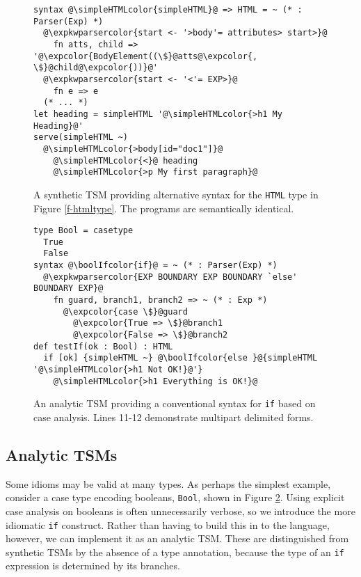 \documentclass{sig-alternate}
\newcommand{\expkwparsercolor}[1]{\textcolor[HTML]{336699}{#1}}
\newcommand{\expcolor}[1]{\textcolor[HTML]{FF0033}{#1}}
\newcommand{\simpleHTMLcolor}[1]{\textcolor[HTML]{7D5100}{#1}}
\newcommand{\boolIfcolor}[1]{\textcolor[HTML]{5E0C0C}{#1}}
\newcommand{\mycaption}[1]{\vspace{-4px}\caption{#1}\vspace{-2px}}
\begin{document}



\begin{figure}[t]
\begin{lstlisting}[style=wyvern]
syntax @\simpleHTMLcolor{simpleHTML}@ => HTML = ~ (* : Parser(Exp) *)
  @\expkwparsercolor{start <- '>body'= attributes> start>}@
    fn atts, child => '@\expcolor{BodyElement((\$}@atts@\expcolor{, \$}@child@\expcolor{))}@'
  @\expkwparsercolor{start <- '<'= EXP>}@
    fn e => e
  (* ... *)
let heading = simpleHTML '@\simpleHTMLcolor{>h1 My Heading}@'
serve(simpleHTML ~)
  @\simpleHTMLcolor{>body[id="doc1"]}@
    @\simpleHTMLcolor{<}@ heading
    @\simpleHTMLcolor{>p My first paragraph}@
\end{lstlisting}
\mycaption{A synthetic TSM providing alternative syntax for the \texttt{HTML} type in Figure \ref{f-htmltype}. The programs are semantically identical.}
\label{f-simplehtml}
\end{figure}
\begin{figure}[t]
\begin{lstlisting}[style=wyvern]
type Bool = casetype 
  True
  False
syntax @\boolIfcolor{if}@ = ~ (* : Parser(Exp) *)
  @\expkwparsercolor{EXP BOUNDARY EXP BOUNDARY `else' BOUNDARY EXP}@
    fn guard, branch1, branch2 => ~ (* : Exp *)
      @\expcolor{case \$}@guard
        @\expcolor{True => \$}@branch1
        @\expcolor{False => \$}@branch2
def testIf(ok : Bool) : HTML
  if [ok] {simpleHTML ~} @\boolIfcolor{else }@{simpleHTML '@\simpleHTMLcolor{>h1 Not OK!}@'}
    @\simpleHTMLcolor{>h1 Everything is OK!}@
\end{lstlisting}
\mycaption{An analytic TSM providing a conventional syntax for \texttt{if} based on case analysis. Lines 11-12 demonstrate multipart delimited forms.}
\label{if-example}
\end{figure}

\subsection{Analytic TSMs}
Some idioms may be valid at many types. As perhaps the simplest example, consider a case type encoding booleans, \verb|Bool|, shown in Figure \ref{if-example}. Using explicit case analysis on booleans is often unnecessarily verbose, so we introduce the more idiomatic \verb|if| construct. Rather than having to build this in to the language, however, we can implement it as an analytic TSM. These are distinguished from synthetic TSMs by the absence of a type annotation, because the type of an \verb|if| expression is determined by its branches. 
\end{document}
